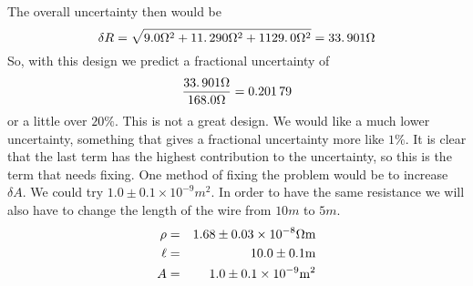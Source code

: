 The overall uncertainty then would be%
\begin{equation*}
\delta R=\sqrt{9.0\unit{%
\Omega%
}^{2}+11.\,\allowbreak 290\unit{%
\Omega%
}^{2}+1129.\,\allowbreak 0\unit{%
\Omega%
}^{2}}=33.\,\allowbreak 901\unit{%
\Omega%
}
\end{equation*}%
So, with this design we predict a fractional uncertainty of 
\begin{equation*}
\frac{33.\,\allowbreak 901\unit{%
\Omega%
}}{168.0\unit{%
\Omega%
}}=0.201\,79
\end{equation*}%
or a little over $20\%.$ This is not a great design. We would like a much
lower uncertainty, something that gives a fractional uncertainty more like $%
1\%.$ It is clear that the last term has the highest contribution to the
uncertainty, so this is the term that needs fixing. One method of fixing the
problem would be to increase $\delta A.$ We could try $1.0\pm 0.1\times
10^{-9}\unit{m}^{2}.$ In order to have the same resistance we will also have
to change the length of the wire from $10\unit{m}$ to $5\unit{m}$. 
\begin{eqnarray*}
\rho &=&1.68\pm 0.03\times 10^{-8}\unit{%
\Omega%
}\unit{m} \\
\ell &=&10.0\pm 0.1\unit{m} \\
A &=&1.0\pm 0.1\times 10^{-9}\unit{m}^{2}
\end{eqnarray*}

